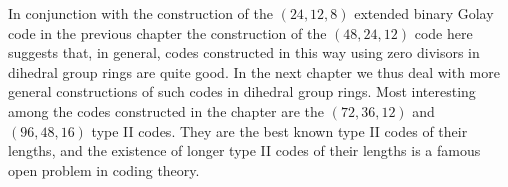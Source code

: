 In conjunction with the construction of the $(24,12,8)$ extended binary Golay code in the previous chapter the construction of the $(48,24,12)$ code here suggests that, in general, codes constructed in this way using zero divisors in dihedral group rings are quite good.
In the next chapter we thus deal with more general constructions of such codes in dihedral group rings.
Most interesting among the codes constructed in the chapter are the $(72,36,12)$ and $(96,48,16)$ type II codes.
They are the best known type II codes of their lengths, and the existence of longer type II codes of their lengths is a famous open problem in coding theory.
